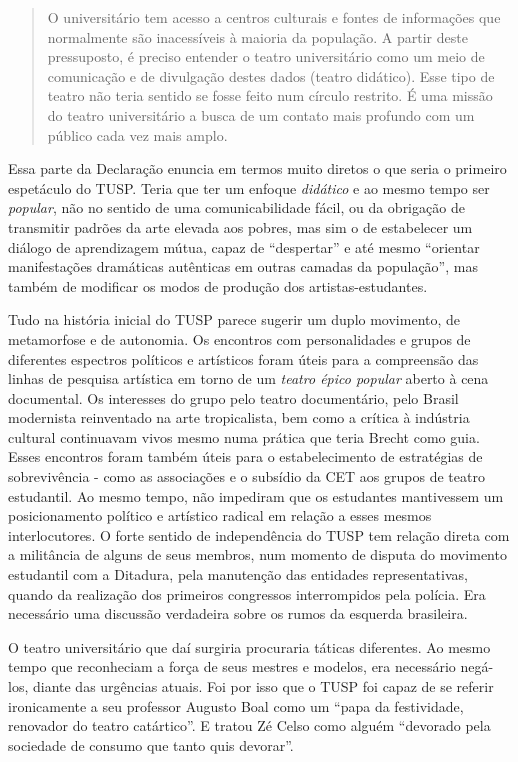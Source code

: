 \begin{quote}
O universitário tem acesso a centros culturais e fontes de informações
que normalmente são inacessíveis à maioria da população. A partir deste
pressuposto, é preciso entender o teatro universitário como um meio de
comunicação e de divulgação destes dados (teatro didático). Esse tipo de
teatro não teria sentido se fosse feito num círculo restrito. É uma
missão do teatro universitário a busca de um contato mais profundo com
um público cada vez mais amplo.
\end{quote}

Essa parte da Declaração enuncia em termos muito diretos o que seria o
primeiro espetáculo do TUSP. Teria que ter um enfoque \textit{didático} e
ao mesmo tempo ser \textit{popular}, não no sentido de uma comunicabilidade
fácil, ou da obrigação de transmitir padrões da arte elevada aos pobres,
mas sim o de estabelecer um diálogo de aprendizagem mútua, capaz de
“despertar” e até mesmo “orientar manifestações dramáticas autênticas em
outras camadas da população”, mas também de modificar os modos de
produção dos artistas-estudantes.

Tudo na história inicial do TUSP parece sugerir um duplo movimento, de
metamorfose e de autonomia. Os encontros com personalidades e grupos de
diferentes espectros políticos e artísticos foram úteis para a
compreensão das linhas de pesquisa artística em torno de um \textit{teatro
épico popular} aberto à cena documental. Os interesses do grupo pelo
teatro documentário, pelo Brasil modernista reinventado na arte
tropicalista, bem como a crítica à indústria cultural continuavam vivos
mesmo numa prática que teria Brecht como guia. Esses encontros foram
também úteis para o estabelecimento de estratégias de sobrevivência -
como as associações e o subsídio da CET aos grupos de teatro estudantil.
Ao mesmo tempo, não impediram que os estudantes mantivessem um
posicionamento político e artístico radical em relação a esses mesmos
interlocutores. O forte sentido de independência do TUSP tem relação
direta com a militância de alguns de seus membros, num momento de
disputa do movimento estudantil com a Ditadura, pela manutenção das
entidades representativas, quando da realização dos primeiros congressos
interrompidos pela polícia. Era necessário uma discussão verdadeira
sobre os rumos da esquerda brasileira.

O teatro universitário que daí surgiria procuraria táticas diferentes.
Ao mesmo tempo que reconheciam a força de seus mestres e modelos, era
necessário negá-los, diante das urgências atuais. Foi por isso que o
TUSP foi capaz de se referir ironicamente a seu professor Augusto Boal
como um “papa da festividade, renovador do teatro catártico”. E tratou
Zé Celso como alguém “devorado pela sociedade de consumo que tanto quis
devorar”.

